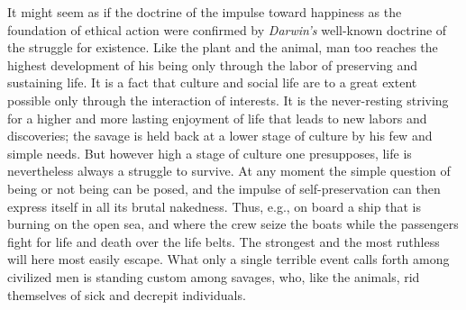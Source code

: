 \documentclass[12pt,a4paper,openany]{book}
\newcommand{\opage}[1]{\marginnote{\footnotesize\textit{[#1]}}}
\begin{document}
\opage{30}It might seem as if the doctrine of the impulse toward happiness as
the foundation of ethical action were confirmed by \emph{Darwin's} well-known
doctrine of the struggle for existence. Like the plant and the animal, man too
reaches the highest development of his being only through the labor of
preserving and sustaining life. It is a fact that culture and social life are
to a great extent possible only through the interaction of interests. It is
the never-resting striving for a higher and more lasting enjoyment of life
that leads to new labors and discoveries; the savage is held back at a lower
stage of culture by his few and simple needs. But however high a stage of
culture one presupposes, life is nevertheless always a struggle to survive. At
any moment the simple question of being or not being can be posed, and the
impulse of self-preservation can then express itself in all its brutal
nakedness. Thus, e.g., on board a ship that is burning on the open sea, and
where the crew seize the boats while the passengers fight for life and death
over the life belts. The strongest and the most ruthless will here most easily
escape. What only a single terrible event calls forth among
\opage{31}civilized men is standing custom among savages, who, like the
animals, rid themselves of sick and decrepit individuals.
\end{document}
